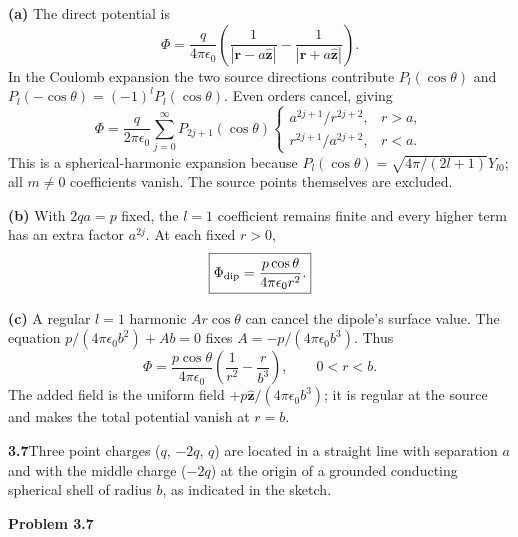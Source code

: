 \textbf{(a)} The direct potential is
\[
\Phi=\frac{q}{4\pi\epsilon_0}
\left(\frac1{|\mathbf r-a\hat{\mathbf z}|}
-\frac1{|\mathbf r+a\hat{\mathbf z}|}\right).
\]
In the Coulomb expansion the two source directions contribute
$P_l(\cos\theta)$ and $P_l(-\cos\theta)=(-1)^lP_l(\cos\theta)$.
Even orders cancel, giving
\[
\boxed{\Phi=\frac{q}{2\pi\epsilon_0}
\sum_{j=0}^\infty P_{2j+1}(\cos\theta)
\begin{cases}
a^{2j+1}/r^{2j+2},&r>a,\\
r^{2j+1}/a^{2j+2},&r<a.
\end{cases}}
\]
This is a spherical-harmonic expansion because
$P_l(\cos\theta)=\sqrt{4\pi/(2l+1)}Y_{l0}$; all $m\ne0$
coefficients vanish.  The source points themselves are excluded.

\textbf{(b)} With $2qa=p$ fixed, the $l=1$ coefficient remains
finite and every higher term has an extra factor $a^{2j}$.  At each
fixed $r>0$,
\[
\boxed{\Phi_{\rm dip}=\frac{p\cos\theta}{4\pi\epsilon_0r^2}.}
\]

\textbf{(c)} A regular $l=1$ harmonic $Ar\cos\theta$ can cancel
the dipole's surface value.  The equation
$p/(4\pi\epsilon_0b^2)+Ab=0$ fixes $A=-p/(4\pi\epsilon_0b^3)$.
Thus
\[
\boxed{\Phi=\frac{p\cos\theta}{4\pi\epsilon_0}
\left(\frac1{r^2}-\frac r{b^3}\right),\qquad0<r<b.}
\]
The added field is the uniform field
$+p\hat{\mathbf z}/(4\pi\epsilon_0b^3)$; it is regular at the
source and makes the total potential vanish at $r=b$.

\par\bigskip
\noindent\textbf{3.7}\quad Three point charges ($q$, $-2q$, $q$) are located in a straight line with separation $a$ and with the middle charge ($-2q$) at the origin of a grounded conducting spherical shell of radius $b$, as indicated in the sketch.

\begin{center}
\par\vspace{0.5em}\textbf{Problem 3.7}
\end{center}

